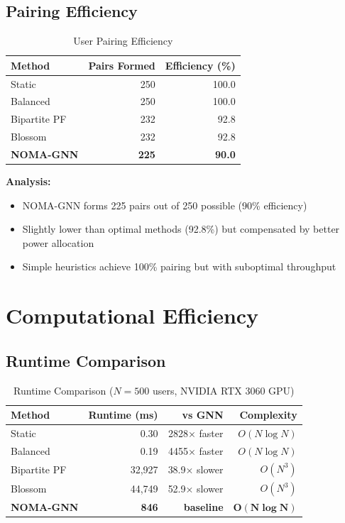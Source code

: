 \subsection{Pairing Efficiency}

\begin{table}[H]
\centering
\begin{tabular}{lrr}
\toprule
\textbf{Method} & \textbf{Pairs Formed} & \textbf{Efficiency (\%)} \\
\midrule
Static & 250 & 100.0 \\
Balanced & 250 & 100.0 \\
Bipartite PF & 232 & 92.8 \\
Blossom & 232 & 92.8 \\
\textbf{NOMA-GNN} & \textbf{225} & \textbf{90.0} \\
\bottomrule
\end{tabular}
\caption{User Pairing Efficiency}
\label{tab:pairing_efficiency}
\end{table}

\textbf{Analysis:}
\begin{itemize}
    \item NOMA-GNN forms 225 pairs out of 250 possible (90\% efficiency)
    \item Slightly lower than optimal methods (92.8\%) but compensated by better power allocation
    \item Simple heuristics achieve 100\% pairing but with suboptimal throughput
\end{itemize}

\section{Computational Efficiency}

\subsection{Runtime Comparison}

\begin{table}[H]
\centering
\begin{tabular}{lrrr}
\toprule
\textbf{Method} & \textbf{Runtime (ms)} & \textbf{vs GNN} & \textbf{Complexity} \\
\midrule
Static & 0.30 & 2828× faster & $O(N \log N)$ \\
Balanced & 0.19 & 4455× faster & $O(N \log N)$ \\
Bipartite PF & 32,927 & 38.9× slower & $O(N^3)$ \\
Blossom & 44,749 & 52.9× slower & $O(N^3)$ \\
\textbf{NOMA-GNN} & \textbf{846} & \textbf{baseline} & $\boldsymbol{O(N \log N)}$ \\
\bottomrule
\end{tabular}
\caption{Runtime Comparison ($N=500$ users, NVIDIA RTX 3060 GPU)}
\label{tab:runtime}
\end{table}

